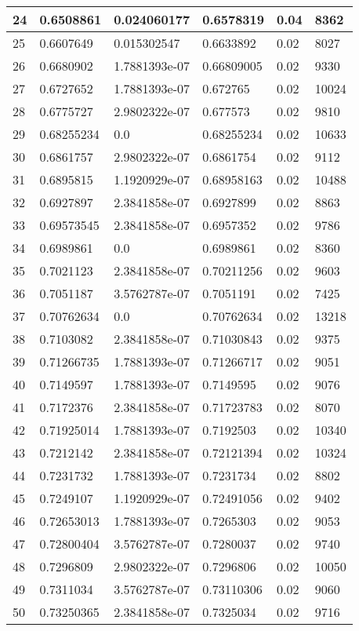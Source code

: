 \begin{longtable}{|l|l|l|l|l|l|}
24 & 0.6508861 & 0.024060177 & 0.6578319 & 0.04 & 8362 \\ \hline 
25 & 0.6607649 & 0.015302547 & 0.6633892 & 0.02 & 8027 \\ \hline 
26 & 0.6680902 & 1.7881393e-07 & 0.66809005 & 0.02 & 9330 \\ \hline 
27 & 0.6727652 & 1.7881393e-07 & 0.672765 & 0.02 & 10024 \\ \hline 
28 & 0.6775727 & 2.9802322e-07 & 0.677573 & 0.02 & 9810 \\ \hline 
29 & 0.68255234 & 0.0 & 0.68255234 & 0.02 & 10633 \\ \hline 
30 & 0.6861757 & 2.9802322e-07 & 0.6861754 & 0.02 & 9112 \\ \hline 
31 & 0.6895815 & 1.1920929e-07 & 0.68958163 & 0.02 & 10488 \\ \hline 
32 & 0.6927897 & 2.3841858e-07 & 0.6927899 & 0.02 & 8863 \\ \hline 
33 & 0.69573545 & 2.3841858e-07 & 0.6957352 & 0.02 & 9786 \\ \hline 
34 & 0.6989861 & 0.0 & 0.6989861 & 0.02 & 8360 \\ \hline 
35 & 0.7021123 & 2.3841858e-07 & 0.70211256 & 0.02 & 9603 \\ \hline 
36 & 0.7051187 & 3.5762787e-07 & 0.7051191 & 0.02 & 7425 \\ \hline 
37 & 0.70762634 & 0.0 & 0.70762634 & 0.02 & 13218 \\ \hline 
38 & 0.7103082 & 2.3841858e-07 & 0.71030843 & 0.02 & 9375 \\ \hline 
39 & 0.71266735 & 1.7881393e-07 & 0.71266717 & 0.02 & 9051 \\ \hline 
40 & 0.7149597 & 1.7881393e-07 & 0.7149595 & 0.02 & 9076 \\ \hline 
41 & 0.7172376 & 2.3841858e-07 & 0.71723783 & 0.02 & 8070 \\ \hline 
42 & 0.71925014 & 1.7881393e-07 & 0.7192503 & 0.02 & 10340 \\ \hline 
43 & 0.7212142 & 2.3841858e-07 & 0.72121394 & 0.02 & 10324 \\ \hline 
44 & 0.7231732 & 1.7881393e-07 & 0.7231734 & 0.02 & 8802 \\ \hline 
45 & 0.7249107 & 1.1920929e-07 & 0.72491056 & 0.02 & 9402 \\ \hline 
46 & 0.72653013 & 1.7881393e-07 & 0.7265303 & 0.02 & 9053 \\ \hline 
47 & 0.72800404 & 3.5762787e-07 & 0.7280037 & 0.02 & 9740 \\ \hline 
48 & 0.7296809 & 2.9802322e-07 & 0.7296806 & 0.02 & 10050 \\ \hline 
49 & 0.7311034 & 3.5762787e-07 & 0.73110306 & 0.02 & 9060 \\ \hline 
50 & 0.73250365 & 2.3841858e-07 & 0.7325034 & 0.02 & 9716 \\ \hline 
\end{longtable}